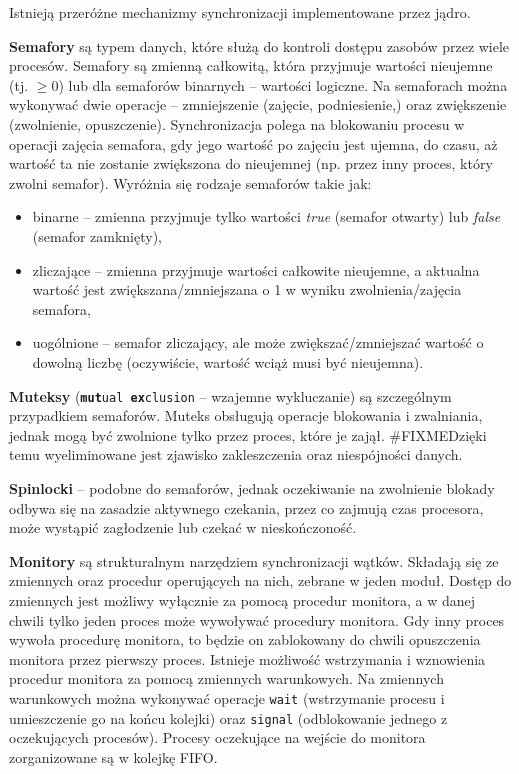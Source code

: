 Istnieją przeróżne mechanizmy synchronizacji implementowane przez jądro.

\textbf{Semafory} są typem danych, które służą do kontroli dostępu zasobów przez wiele procesów.
Semafory są zmienną całkowitą, która przyjmuje wartości nieujemne (tj. $\ge 0$) lub dla semaforów binarnych -- wartości logiczne.
Na semaforach można wykonywać dwie operacje -- zmniejszenie (zajęcie, podniesienie,) oraz zwiększenie (zwolnienie, opuszczenie).
Synchronizacja polega na blokowaniu procesu w operacji zajęcia semafora, gdy jego wartość po zajęciu jest ujemna, do czasu, aż wartość ta nie zostanie zwiększona do nieujemnej (np. przez inny proces, który zwolni semafor).
Wyróżnia się rodzaje semaforów takie jak:
\begin{itemize}
\item binarne -- zmienna przyjmuje tylko wartości \textit{true} (semafor otwarty) lub \textit{false} (semafor zamknięty),
\item zliczające -- zmienna przyjmuje wartości całkowite nieujemne, a aktualna wartość jest zwiększana/zmniejszana o 1 w wyniku zwolnienia/zajęcia semafora,
\item uogólnione -- semafor zliczający, ale może zwiększać/zmniejszać wartość o dowolną liczbę (oczywiście, wartość wciąż musi być nieujemna).
\end{itemize}

\textbf{Muteksy} (\texttt{\textbf{mut}ual \textbf{ex}clusion} -- wzajemne wykluczanie) są szczególnym przypadkiem semaforów. Muteks obsługują operacje blokowania i zwalniania, jednak mogą być zwolnione tylko przez proces, które je zajął.
#FIXMEDzięki temu wyeliminowane jest zjawisko zakleszczenia oraz niespójności danych.

\textbf{Spinlocki} -- podobne do semaforów, jednak oczekiwanie na zwolnienie blokady odbywa się na zasadzie aktywnego czekania, przez co zajmują czas procesora, może wystąpić zagłodzenie lub czekać w nieskończoność.

\textbf{Monitory} są strukturalnym narzędziem synchronizacji wątków. Składają się ze zmiennych oraz procedur operujących na nich, zebrane w jeden moduł. Dostęp do zmiennych jest możliwy wyłącznie za pomocą procedur monitora, a w danej chwili tylko jeden proces może wywoływać procedury monitora. Gdy inny proces wywoła procedurę monitora, to będzie on zablokowany do chwili opuszczenia monitora przez pierwszy proces. Istnieje możliwość wstrzymania i wznowienia procedur monitora za pomocą zmiennych warunkowych. Na zmiennych warunkowych można wykonywać operacje \texttt{wait} (wstrzymanie procesu i umieszczenie go na końcu kolejki) oraz \texttt{signal} (odblokowanie jednego z oczekujących procesów). Procesy oczekujące na wejście do monitora zorganizowane są w kolejkę FIFO.